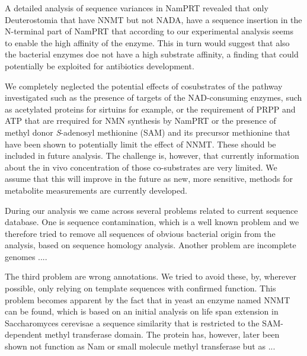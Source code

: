 A detailed analysis of sequence variances in NamPRT revealed that only Deuterostomia that have NNMT but not NADA, have a sequence insertion in the N-terminal part of NamPRT that according to our experimental analysis seems to enable the high affinity of the enzyme. This in turn would suggest that also the bacterial enzymes doe not have a high substrate affinity, a finding that could potentially be exploited for antibiotics development.






We completely neglected the potential effects of cosubstrates of the pathway investigated such as the presence of targets of the NAD-consuming enzymes, such as acetylated proteins for sirtuins for example, or the requirement of PRPP and ATP that are rrequired for NMN synthesis by NamPRT  or the presence of methyl donor \textit{S}-adenosyl methionine (SAM) and its precursor methionine that have been shown to potentially limit the effect of NNMT\cite{PMID:23455543 }. These should be included in future analysis. The challenge is, however, that currently information about the in vivo concentration of those co-substrates are very limited. We assume that this will improve in the future as new, more sensitive, methods for metabolite measurements are currently developed.

During our analysis we came across several problems related to current sequence database. One is sequence contamination, which is a well known problem and we therefore tried to remove all sequences of obvious bacterial origin from the analysis, based on sequence homology analysis. Another problem are incomplete genomes .... 

The third problem are wrong annotations. We tried to avoid these, by, wherever possible, only relying on template sequences with confirmed function. This problem becomes apparent by the fact that in yeast an enzyme named NNMT can be found, which is based on an initial analysis on life span extension in Saccharomyces cerevisae a sequence similarity that is restricted to the SAM-dependent methyl transferase domain.  The protein has, however, later been shown not function as Nam or small molecule methyl transferase but as ...

